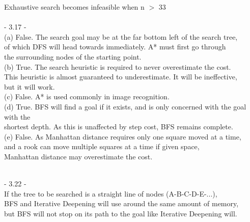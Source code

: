 \documentclass[12pt]{article}
\begin{document}
Exhaustive search becomes infeasible when n $>$ 33\\





\noindent \hrulefill \\




- 3.17 - \\

(a) False. The search goal may be at the far bottom left of the search tree, \\
\indent\indent of which DFS will head towards immediately. A* must first go through \\
\indent\indent the surrounding nodes of the starting point.\\

(b) True. The search heuristic is required to never overestimate the cost. \\
\indent\indent This heuristic is almost  guaranteed to underestimate. It will be ineffective, \\
\indent\indent but it will work.\\

(c) False. A* is used commonly in image recognition.\\

(d) True. BFS will find a goal if it exists, and is only concerned with the goal with the \\
\indent\indent shortest depth. As this is unaffected by step cost, BFS remains complete.\\

(e) False. As Manhattan distance requires only one square moved at a time, \\
\indent\indent and a rook can move multiple squares at a time if given space, \\
\indent\indent Manhattan distance may overestimate the cost.




\noindent \hrulefill \\




- 3.22 - \\

If the tree to be searched is a straight line of nodes (A-B-C-D-E-...), \\
\indent BFS and Iterative Deepening will use around the same amount of memory, \\
\indent but BFS will not stop on its path to the goal like Iterative Deepening will.\\
  
\end{document}
